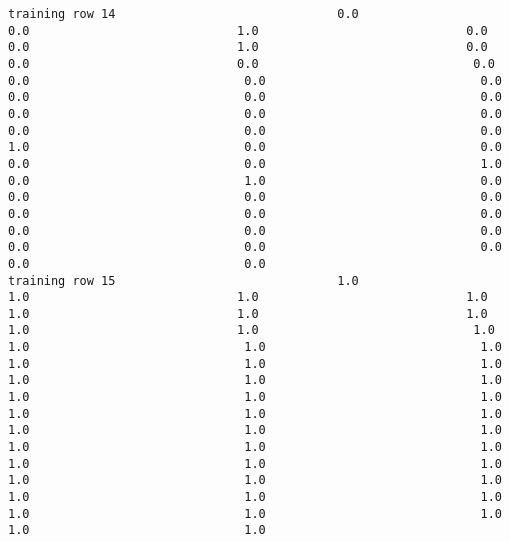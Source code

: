 \documentclass[11pt]{article}
\begin{document}
\begin{verbatim}
training row 14                               0.0                             0.0                             1.0                             0.0                             0.0                             1.0                             0.0                             0.0                             0.0                              0.0                              0.0                              0.0                              0.0                              0.0                              0.0                              0.0                              0.0                              0.0                              0.0                              0.0                              0.0                              0.0                              1.0                              0.0                              0.0                              0.0                              0.0                              1.0                              0.0                              1.0                              0.0                              0.0                              0.0                              0.0                              0.0                              0.0                              0.0                              0.0                              0.0                              0.0                              0.0                              0.0                              0.0                              0.0                              0.0
training row 15                               1.0                             1.0                             1.0                             1.0                             1.0                             1.0                             1.0                             1.0                             1.0                              1.0                              1.0                              1.0                              1.0                              1.0                              1.0                              1.0                              1.0                              1.0                              1.0                              1.0                              1.0                              1.0                              1.0                              1.0                              1.0                              1.0                              1.0                              1.0                              1.0                              1.0                              1.0                              1.0                              1.0                              1.0                              1.0                              1.0                              1.0                              1.0                              1.0                              1.0                              1.0                              1.0                              1.0                              1.0                              1.0

\end{verbatim}
\end{document}
